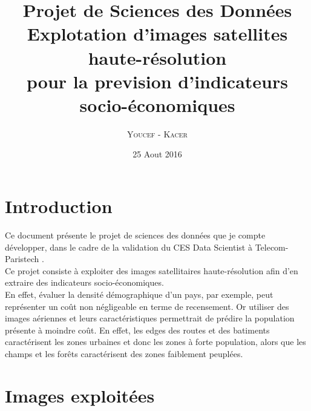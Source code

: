 \documentclass{book}
\title{%
  Projet de Sciences des Données \\
  \large Explotation d'images satellites haute-résolution \\pour la prevision d'indicateurs socio-économiques \\
    }
\author{\textsc{Youcef} - \textsc{Kacer}}
\date{25 Aout 2016}
\begin{document}
 
\maketitle

\tableofcontents

\frontmatter
\chapter{Introduction}
Ce document présente le projet de sciences des données que je compte développer, dans le cadre de la validation du CES Data Scientist à Telecom-Paristech \cite{cesds}.\\
Ce projet consiste à exploiter des images satellitaires haute-résolution afin d'en extraire des indicateurs socio-économiques.\\
En effet, évaluer la densité démographique d'un pays, par exemple, peut représenter un co\^{u}t non négligeable en terme de 
recensement. Or utiliser des images aériennes et leurs caractéristiques permettrait de prédire la population présente à moindre co\^{u}t.
En effet, les \og edges \fg{} des routes et des batiments caractérisent les zones urbaines et donc les zones à forte population, alors que
les champs et les for\^{e}ts caractérisent des zones faiblement peuplées.\\

\mainmatter
\chapter{Images exploitées}
\end{document}
